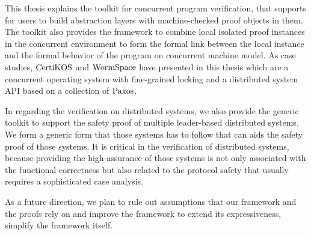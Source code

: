 %

This thesis 
explains
the toolkit 
for concurrent program verification, 
that supports for users to build abstraction layers with machine-checked proof objects in them. 
The toolkit also provides 
the framework 
to combine local isolated proof instances in the concurrent environment 
to form the formal link between the local instance and
the formal behavior of the program on concurrent machine model. 
As case studies, 
$\mathrm{CertiKOS}$ and $\mathrm{WormSpace}$ 
have presented in this thesis
which are a concurrent operating system with fine-grained locking
and a distributed system API 
based on a collection of $\mathrm{Paxos}$. 

In regarding the verification on distributed systems,
we also provide the generic toolkit to support the safety proof of multiple leader-based distributed systems. 
We form a generic form that those systems has to follow that can aids the safety proof of those systems. 
It is critical in the verification of distributed systems, 
because providing
the high-assurance of those systems 
is not only associated with the functional correctness
but also related to the protocol safety that usually
requires a sophisticated case analysis.

As a future direction, 
we plan 
to rule out assumptions that 
our framework and the proofs rely on
and improve 
the framework to extend its expressiveness, 
simplify the framework itself.

